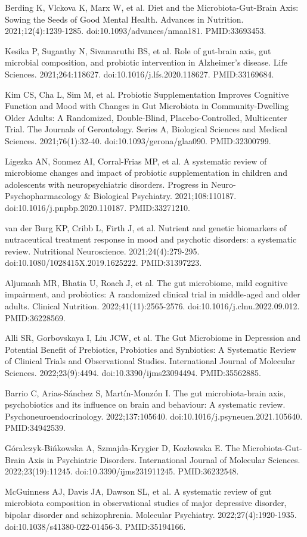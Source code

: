 \documentclass[11pt,oneside]{book}
\newcommand{\reff}[2]{\par\hangindent=7mm\hangafter=1\noindent[#1]\hspace{2mm}#2\par}
\begin{document}
\reff{10}{Berding K, Vlckova K, Marx W, et al. Diet and the Microbiota-Gut-Brain Axis: Sowing the Seeds of Good Mental Health. Advances in Nutrition. 2021;12(4):1239-1285. doi:10.1093/advances/nmaa181. PMID:33693453.}
\reff{11}{Kesika P, Suganthy N, Sivamaruthi BS, et al. Role of gut-brain axis, gut microbial composition, and probiotic intervention in Alzheimer's disease. Life Sciences. 2021;264:118627. doi:10.1016/j.lfs.2020.118627. PMID:33169684.}
\reff{12}{Kim CS, Cha L, Sim M, et al. Probiotic Supplementation Improves Cognitive Function and Mood with Changes in Gut Microbiota in Community-Dwelling Older Adults: A Randomized, Double-Blind, Placebo-Controlled, Multicenter Trial. The Journals of Gerontology. Series A, Biological Sciences and Medical Sciences. 2021;76(1):32-40. doi:10.1093/gerona/glaa090. PMID:32300799.}
\reff{13}{Ligezka AN, Sonmez AI, Corral-Frias MP, et al. A systematic review of microbiome changes and impact of probiotic supplementation in children and adolescents with neuropsychiatric disorders. Progress in Neuro-Psychopharmacology \& Biological Psychiatry. 2021;108:110187. doi:10.1016/j.pnpbp.2020.110187. PMID:33271210.}
\reff{14}{van der Burg KP, Cribb L, Firth J, et al. Nutrient and genetic biomarkers of nutraceutical treatment response in mood and psychotic disorders: a systematic review. Nutritional Neuroscience. 2021;24(4):279-295. doi:10.1080/1028415X.2019.1625222. PMID:31397223.}
\reff{15}{Aljumaah MR, Bhatia U, Roach J, et al. The gut microbiome, mild cognitive impairment, and probiotics: A randomized clinical trial in middle-aged and older adults. Clinical Nutrition. 2022;41(11):2565-2576. doi:10.1016/j.clnu.2022.09.012. PMID:36228569.}
\reff{16}{Alli SR, Gorbovskaya I, Liu JCW, et al. The Gut Microbiome in Depression and Potential Benefit of Prebiotics, Probiotics and Synbiotics: A Systematic Review of Clinical Trials and Observational Studies. International Journal of Molecular Sciences. 2022;23(9):4494. doi:10.3390/ijms23094494. PMID:35562885.}
\reff{17}{Barrio C, Arias-Sánchez S, Martín-Monzón I. The gut microbiota-brain axis, psychobiotics and its influence on brain and behaviour: A systematic review. Psychoneuroendocrinology. 2022;137:105640. doi:10.1016/j.psyneuen.2021.105640. PMID:34942539.}
\reff{18}{Góralczyk-Bińkowska A, Szmajda-Krygier D, Kozłowska E. The Microbiota-Gut-Brain Axis in Psychiatric Disorders. International Journal of Molecular Sciences. 2022;23(19):11245. doi:10.3390/ijms231911245. PMID:36232548.}
\reff{19}{McGuinness AJ, Davis JA, Dawson SL, et al. A systematic review of gut microbiota composition in observational studies of major depressive disorder, bipolar disorder and schizophrenia. Molecular Psychiatry. 2022;27(4):1920-1935. doi:10.1038/s41380-022-01456-3. PMID:35194166.}
\end{document}
